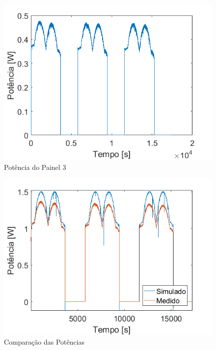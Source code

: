 \begin{figure}[!htpb]
\begin{center}
\includegraphics[scale=0.5]{figures/testPanel3Power.png}
\caption{Potência do Painel 3}
\label{figura_teste_potencia_painel3}
\end{center}
\end{figure}

\begin{figure}[!htpb]
\begin{center}
\includegraphics[scale=0.5]{figures/powerComparison.png}
\caption{Comparação das Potências}
\label{figura_potencia_comaracao}
\end{center}
\end{figure}

